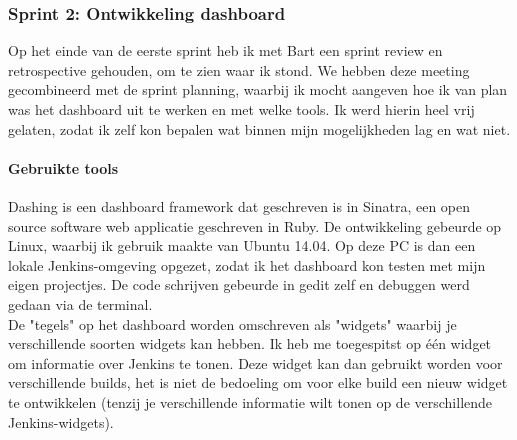 \documentclass[10pt,a4paper]{article}
\begin{document}
\subsubsection{Sprint 2: Ontwikkeling dashboard} 
\label{sprint2}
Op het einde van de eerste sprint heb ik met Bart een sprint review en retrospective gehouden, om te zien waar ik stond. We hebben deze meeting gecombineerd met de sprint planning, waarbij ik mocht aangeven hoe ik van plan was het dashboard uit te werken en met welke tools. Ik werd hierin heel vrij gelaten, zodat ik zelf kon bepalen wat binnen mijn mogelijkheden lag en wat niet. 
\paragraph{Gebruikte tools}
Dashing is een dashboard framework dat geschreven is in Sinatra, een open source software web applicatie geschreven in Ruby. De ontwikkeling gebeurde op Linux, waarbij ik gebruik maakte van Ubuntu 14.04. Op deze PC is dan een lokale Jenkins-omgeving opgezet, zodat ik het dashboard kon testen met mijn eigen projectjes. De code schrijven gebeurde in gedit zelf en debuggen werd gedaan via de terminal.  \\
De "tegels" op het dashboard worden omschreven als "widgets" waarbij je verschillende soorten widgets kan hebben. Ik heb me toegespitst op \'e\'en widget om informatie over Jenkins te tonen. Deze widget kan dan gebruikt worden voor verschillende builds, het is niet de bedoeling om voor elke build een nieuw widget te ontwikkelen (tenzij je verschillende informatie wilt tonen op de verschillende Jenkins-widgets).
\end{document}
